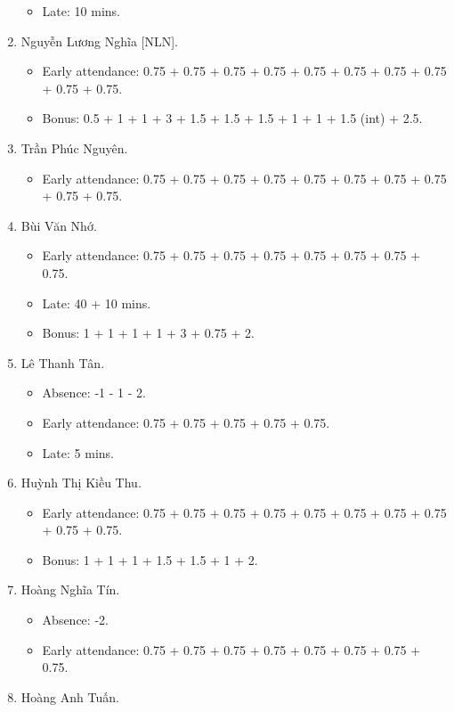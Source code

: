 \documentclass{article}
\begin{document}
\begin{enumerate}
\begin{itemize}
		\item Late: 10 mins.
	\end{itemize}
	\item {\sc Nguyễn Lương Nghĩa [NLN].}
	\begin{itemize}
		\item Early attendance: 0.75 + 0.75 + 0.75 + 0.75 + 0.75 + 0.75 + 0.75 + 0.75 + 0.75 + 0.75.
		\item Bonus: 0.5 + 1 + 1 + 3 + 1.5 + 1.5 + 1.5 + 1 + 1 + 1.5 (int) + 2.5.
	\end{itemize}
	\item {\sc Trần Phúc Nguyên.}
	\begin{itemize}
		\item Early attendance: 0.75 + 0.75 + 0.75 + 0.75 + 0.75 + 0.75 + 0.75 + 0.75 + 0.75 + 0.75.
	\end{itemize}
	\item {\sc Bùi Văn Nhớ.}
	\begin{itemize}
		\item Early attendance: 0.75 + 0.75 + 0.75 + 0.75 + 0.75 + 0.75 + 0.75 + 0.75.
		\item Late: 40 + 10 mins.
		\item Bonus: 1 + 1 + 1 + 1 + 3 + 0.75 + 2.
	\end{itemize}
	\item {\sc Lê Thanh Tân.}
	\begin{itemize}
		\item Absence: -1 - 1 - 2.
		\item Early attendance: 0.75 + 0.75 + 0.75 + 0.75 + 0.75.
		\item Late: 5 mins.
	\end{itemize}
	\item {\sc Huỳnh Thị Kiều Thu.}
	\begin{itemize}
		\item Early attendance: 0.75 + 0.75 + 0.75 + 0.75 + 0.75 + 0.75 + 0.75 + 0.75 + 0.75 + 0.75.
		\item Bonus: 1 + 1 + 1 + 1.5 + 1.5 + 1 + 2.
	\end{itemize}
	\item {\sc Hoàng Nghĩa Tín.}
	\begin{itemize}
        \item Absence: -2.
		\item Early attendance: 0.75 + 0.75 + 0.75 + 0.75 + 0.75 + 0.75 + 0.75 + 0.75.
	\end{itemize}
	\item {\sc Hoàng Anh Tuấn.}
	\begin{itemize}

\end{itemize}
\end{enumerate}
\end{document}
